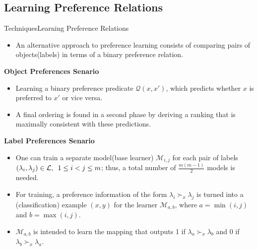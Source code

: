 \documentclass[]{beamer}
\newcommand{\Ytri}{$\triangleright$ }
\newcommand{\itemYtri}{\item[\Ytri]}
\renewcommand{\|}[1][.3em]{\hspace{#1}|\hspace{#1}}
\renewcommand{\,}[1][.3em]{,\hspace{#1}}
\begin{document}
\subsection{Learning Preference Relations}
\begin{frame}{Techniques}{Learning Preference Relations}
    \begin{itemize}\footnotesize
    \item  An alternative approach to preference learning consists of comparing pairs of objects(labels) in terms of a binary preference relation.
    \end{itemize}
    \pause
    \begin{block}{\textbf{Object Preferences Senario}}\footnotesize
        \begin{itemize}[<+->]
        \itemYtri Learning a binary preference predicate $\mathcal{Q}(x, x')$, which
predicts whether $x$ is preferred to $x'$ or vice versa.
        \itemYtri A final ordering is found in a second phase by deriving a ranking that is maximally consistent with these predictions.
        \end{itemize}
    \end{block}
    \begin{block}{\textbf{Label Preferences Senario}}\scriptsize
        \begin{itemize}[<+->]
        \itemYtri One can train a separate model(base learner) $\mathcal{M}_{i,j}$ for each pair of labels $(\lambda_i , \lambda_j ) \in \mathcal{L},\hspace{.5em}1\leq i < j \leq m$; thus, a total number of $\frac{m(m - 1)}{2}$ models is needed.
        \itemYtri  For training, a preference information of the form $\lambda_i \succ_x \lambda_j$ is turned into a (classification) example $(x, y)$ for the learner $\mathcal{M}_{a,b}$, where $a = \min(i, j)$ and $b = \max(i, j)$.
        \itemYtri $\mathcal{M}_{a,b}$ is intended to learn the mapping that outputs 1 if $\lambda_a \succ_x \lambda_b$ and 0 if $\lambda_b \succ_x \lambda_a$.
        \end{itemize}
    \end{block}
\end{frame}
\end{document}
